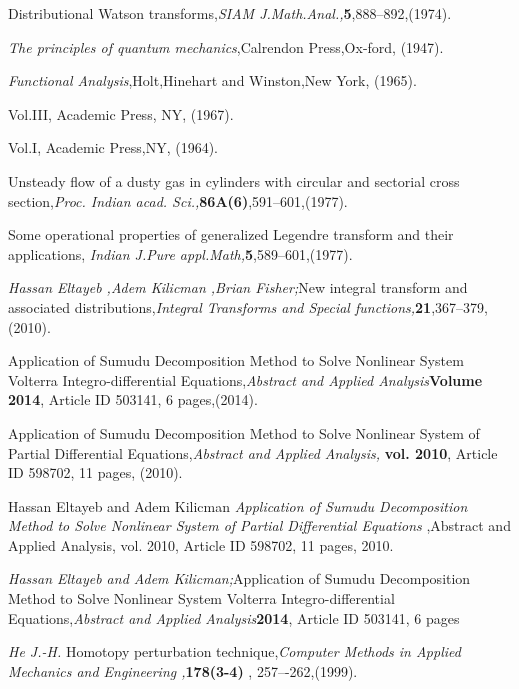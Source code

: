 \begin{thebibliography}{00}
Distributional Watson transforms,{\it SIAM J.Math.Anal.,}{\bf 5},888--892,(1974).

 {\it The principles of quantum mechanics},Calrendon Press,Ox-ford, (1947).

 {\it Functional Analysis},Holt,Hinehart and Winston,New York, (1965).

 Vol.III, Academic Press, NY, (1967).

 Vol.I, Academic Press,NY, (1964).

Unsteady flow of a dusty gas in cylinders with circular and sectorial cross section,{\it Proc. Indian acad. Sci.,}{\bf 86A(6)},591--601,(1977).


Some operational properties of generalized Legendre transform and their applications,{\it
Indian J.Pure appl.Math,}{\bf 5},589--601,(1977).

 {\sl Hassan Eltayeb ,Adem Kilicman ,Brian Fisher;}New integral transform and associated distributions,{\it Integral Transforms and Special functions,}{\bf 21},367--379,(2010).

Application of Sumudu Decomposition Method to Solve Nonlinear System Volterra Integro-differential Equations,{\it Abstract and Applied Analysis}{\bf Volume 2014}, Article ID 503141, 6 pages,(2014).

Application of Sumudu Decomposition
Method to Solve Nonlinear System of Partial
Differential Equations,{\it Abstract and Applied Analysis,} {\bf vol. 2010}, Article ID 598702, 11 pages, (2010).

  Hassan Eltayeb and Adem Kilicman \textit{Application of Sumudu Decomposition
Method to Solve Nonlinear System of Partial
Differential Equations} ,Abstract and Applied Analysis, vol. 2010, Article ID 598702, 11 pages, 2010.

 {\sl Hassan Eltayeb and Adem Kilicman;}Application of Sumudu Decomposition Method to Solve Nonlinear System Volterra Integro-differential Equations,{\it Abstract and Applied Analysis}{\bf 2014}, Article ID 503141, 6 pages

 {\sl He J.-H.} Homotopy perturbation technique,{\it Computer Methods in Applied Mechanics and Engineering ,}{\bf 178(3-4)} , 257–-262,(1999).


\end{thebibliography}
